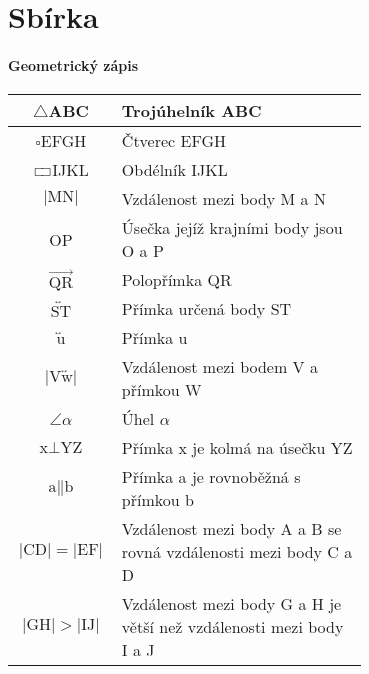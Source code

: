 \chapter{Sbírka}

\subsubsection{Geometrický zápis}
\begin{tabular}{|c|p{0.7\linewidth}|}
    \hline
    $\triangle$ABC                                         & Trojúhelník ABC                                                     \\ \hline
    $\square$EFGH                                          & Čtverec EFGH                                                        \\ \hline
    $\rectangle$IJKL                                       & Obdélník IJKL                                                       \\ \hline
    $\lvert \text{MN} \rvert$                              & Vzdálenost mezi body M a N                                          \\ \hline
    OP                                & Úsečka jejíž krajními body jsou O a P                                                           \\ \hline
    $\overrightarrow{\text{QR}}$                           & Polopřímka QR                                                       \\ \hline
    $\overleftrightarrow{\text{ST}}$                       & Přímka určená body ST                                               \\ \hline
    $\overleftrightarrow{\text{u}}$                        & Přímka u                                                            \\ \hline
    $\lvert \text{V} \overleftrightarrow{\text{w}} \rvert$ & Vzdálenost mezi bodem V a přímkou W                                 \\ \hline
    $\angle \alpha $                                       & Úhel $\alpha$                                                       \\ \hline
    $ \text{x} \perp \text{YZ} $                       & Přímka x je kolmá na úsečku YZ                                      \\ \hline
    $\text{a} \| \text{b}$                                               & Přímka a je rovnoběžná s přímkou b                                  \\ \hline
    $\lvert \text{CD} \rvert = \lvert \text{EF} \rvert$    & Vzdálenost mezi body A a B se rovná vzdálenosti mezi body C a D     \\ \hline
    $\lvert \text{GH} \rvert > \lvert \text{IJ} \rvert$    & Vzdálenost mezi body G a H je větší než vzdálenosti mezi body I a J \\ \hline
\end{tabular}

\newpage
